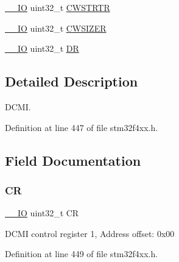 \begin{DoxyCompactItemize}
\item 
\hyperlink{group___c_m_s_i_s__core__definitions_gaec43007d9998a0a0e01faede4133d6be}{\+\_\+\+\_\+\+IO} uint32\+\_\+t \hyperlink{struct_d_c_m_i___type_def_a919b70dd8762e44263a02dfbafc7b8ce}{C\+W\+S\+T\+R\+TR}
\item 
\hyperlink{group___c_m_s_i_s__core__definitions_gaec43007d9998a0a0e01faede4133d6be}{\+\_\+\+\_\+\+IO} uint32\+\_\+t \hyperlink{struct_d_c_m_i___type_def_aa3ccc5d081bbee3c61ae9aa5e0c83af9}{C\+W\+S\+I\+Z\+ER}
\item 
\hyperlink{group___c_m_s_i_s__core__definitions_gaec43007d9998a0a0e01faede4133d6be}{\+\_\+\+\_\+\+IO} uint32\+\_\+t \hyperlink{struct_d_c_m_i___type_def_a3df0d8dfcd1ec958659ffe21eb64fa94}{DR}
\end{DoxyCompactItemize}


\subsection{Detailed Description}
D\+C\+MI. 

Definition at line 447 of file stm32f4xx.\+h.



\subsection{Field Documentation}
\mbox{\label{struct_d_c_m_i___type_def_ab40c89c59391aaa9d9a8ec011dd0907a}} 
\subsubsection{\texorpdfstring{CR}{CR}}
{\footnotesize\ttfamily \hyperlink{group___c_m_s_i_s__core__definitions_gaec43007d9998a0a0e01faede4133d6be}{\+\_\+\+\_\+\+IO} uint32\+\_\+t CR}

D\+C\+MI control register 1, Address offset\+: 0x00 

Definition at line 449 of file stm32f4xx.\+h.

\mbox{\label{struct_d_c_m_i___type_def_aa3ccc5d081bbee3c61ae9aa5e0c83af9}} 
